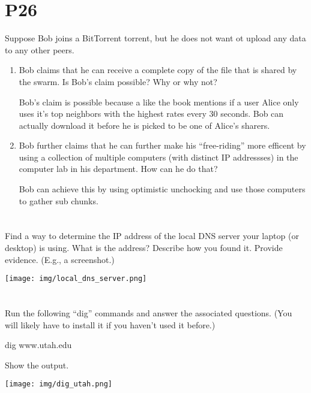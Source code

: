 \documentclass[11pt]{article}
\begin{document}
\section*{P26}

Suppose Bob joins a BitTorrent torrent, but he does not want ot upload any data to any other peers.

\begin{enumerate}[label=(\alph*)]
\item Bob claims that he can receive a complete copy of the file that is shared by the swarm. Is Bob's claim possible? Why or why not?

Bob's claim is possible because a like the book mentions if a user Alice only uses it's top neighbors with the highest rates every 30 seconds. Bob can actually download it before he is picked to be one of Alice's sharers.

\item Bob further claims that he can further make his ``free-riding'' more efficent by using a collection of multiple computers (with distinct IP addressses) in the computer lab in his department. How can he do that?


Bob can achieve this by using optimistic unchocking and use those computers to gather sub chunks.
\end{enumerate}


\section{}

Find a way to determine the IP address of the local DNS server your laptop (or desktop) is using. What is the address? Describe how you found it. Provide evidence. (E.g., a screenshot.)

\texttt{[image: img/local\_dns\_server.png]}

\section{} 
Run the following ``dig'' commands and answer the associated questions. (You will likely have to install it if you haven't used it before.)

dig www.utah.edu

Show the output.

\texttt{[image: img/dig\_utah.png]}
\end{document}
